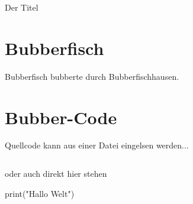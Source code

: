 \documentclass{\VorlagenPfad/coderdojokatext}
\newcommand{\Titel}{Der Titel}
\begin{document}
\begin{center}
	{\huge \Titel}
\end{center}

\section{Bubberfisch}
Bubberfisch bubberte durch Bubberfischhausen.

\section{Bubber-Code}
Quellcode kann aus einer Datei eingelsen werden...
\inputminted[firstline=5, lastline=8,linenos]{python}{../Python/Beispiele/zahlen_raten.py}

oder auch direkt hier stehen

\begin{pythoncode}
print("Hallo Welt")
\end{pythoncode}
\end{document}
